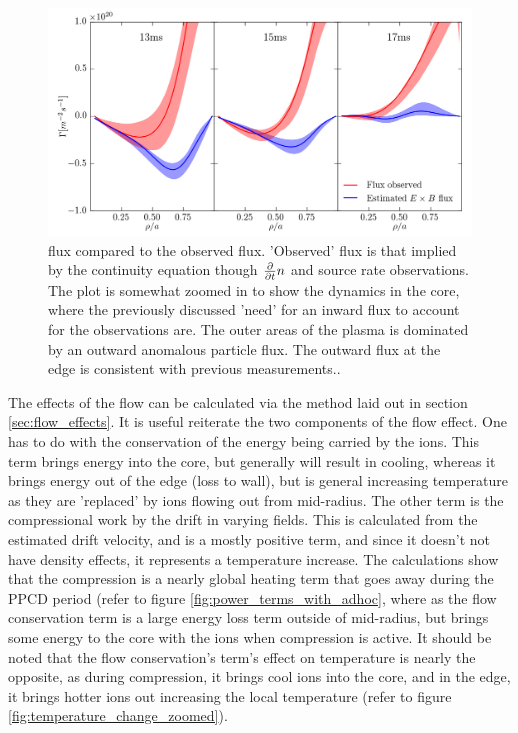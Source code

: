 \begin{figure}
    \centering
    \includegraphics[width=\linewidth]{ion_transport_results/flux_comp.png}
    \caption[\ecb flux compared to measured flux]{\ecb flux compared to the observed flux. 'Observed' flux is that implied by the continuity equation though $\frac{\partial}{\partial t} n$ and source rate observations. The plot is somewhat zoomed in to show the dynamics in the core, where the previously discussed 'need' for an inward flux to account for the observations are. The outer areas of the plasma is dominated by an outward anomalous particle flux. The outward flux at the edge is consistent with previous measurements.\cite{Lanier2001a}. }
    \label{fig:eb_flux}
\end{figure}
The effects of the flow can be calculated via the method laid out in section \ref{sec:flow_effects}. It is useful reiterate the two components of the flow effect. One has to do with the conservation of the energy being carried by the ions. This term brings energy into the core, but generally will result in cooling, whereas it brings energy out of the edge (loss to wall), but is general increasing temperature as they are 'replaced' by ions flowing out from mid-radius. The other term is the compressional work by the \ecb drift in varying fields. This is calculated from the estimated drift velocity, and is a mostly positive term, and since it doesn't not have density effects, it represents a temperature increase. The calculations show that the compression is a nearly global heating term that goes away during the PPCD period (refer to figure \ref{fig:power_terms_with_adhoc}, where as the flow conservation term is a large energy loss term outside of mid-radius, but brings some energy to the core with the ions when compression is active. It should be noted that the flow conservation's term's effect on temperature is nearly the opposite, as during compression, it brings cool ions into the core, and in the edge, it brings hotter ions out increasing the local temperature (refer to figure \ref{fig:temperature_change_zoomed}).